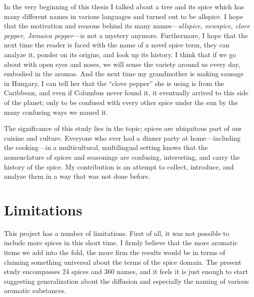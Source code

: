 In the very beginning of this thesis I talked about a tree and its spice which has many different names in various languages and turned out to be allspice. I hope that the motivation and reasons behind its many names---\textit{allspice, newspice, clove pepper, Jamaica pepper}---is not a mystery anymore. Furthermore, I hope that the next time the reader is faced with the name of a novel spice term, they can analyze it, ponder on its origins, and look up its history. I think that if we go about with open eyes and noses, we will sense the variety around us every day, embodied in the aromas. And the next time my grandmother is making sausage in Hungary, I can tell her that the ``clove pepper'' she is using is from the Caribbean, and even if Columbus never found it, it eventually arrived to this side of the planet; only to be confused with every other spice under the sun by the many confusing ways we named it.

The significance of this study lies in the topic; spices are ubiquitous part of our cuisine and culture. Everyone who ever had a dinner party at home---including the cooking---in a multicultural, multilingual setting knows that the nomenclature of spices and seasonings are confusing, interesting, and carry the history of the spice. My contribution is an attempt to collect, introduce, and analyze them in a way that was not done before. 


\section{Limitations}
\label{sec:limitations}


This project has a number of limitations. First of all, it was not possible to include more spices in this short time. I firmly believe that the more aromatic items we add into the fold, the more firm the results would be in terms of claiming something universal about the terms of the spice domain. The present study encompasses 24 spices and 360 names, and it feels it is just enough to start suggesting generalization about the diffusion and especially the naming of various aromatic substances.

